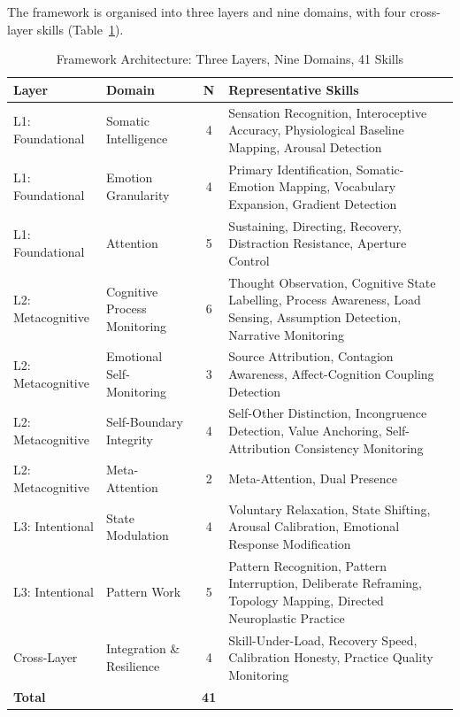 \documentclass[12pt, a4paper]{article}
\begin{document}
The framework is organised into three layers and nine domains, with four cross-layer
skills (Table~\ref{tab:architecture}).

\begin{table}[htbp]
\centering
\caption{Framework Architecture: Three Layers, Nine Domains, 41 Skills}
\label{tab:architecture}
\small
\begin{tabular}{llcp{6cm}}
\toprule
\textbf{Layer} & \textbf{Domain} & \textbf{N} & \textbf{Representative Skills} \\
\midrule
L1: Foundational & Somatic Intelligence & 4 &
  Sensation Recognition, Interoceptive Accuracy, Physiological Baseline Mapping, Arousal Detection \\
L1: Foundational & Emotion Granularity & 4 &
  Primary Identification, Somatic-Emotion Mapping, Vocabulary Expansion, Gradient Detection \\
L1: Foundational & Attention & 5 &
  Sustaining, Directing, Recovery, Distraction Resistance, Aperture Control \\
\midrule
L2: Metacognitive & Cognitive Process Monitoring & 6 &
  Thought Observation, Cognitive State Labelling, Process Awareness, Load Sensing, Assumption Detection, Narrative Monitoring \\
L2: Metacognitive & Emotional Self-Monitoring & 3 &
  Source Attribution, Contagion Awareness, Affect-Cognition Coupling Detection \\
L2: Metacognitive & Self-Boundary Integrity & 4 &
  Self-Other Distinction, Incongruence Detection, Value Anchoring, Self-Attribution Consistency Monitoring \\
L2: Metacognitive & Meta-Attention & 2 &
  Meta-Attention, Dual Presence \\
\midrule
L3: Intentional & State Modulation & 4 &
  Voluntary Relaxation, State Shifting, Arousal Calibration, Emotional Response Modification \\
L3: Intentional & Pattern Work & 5 &
  Pattern Recognition, Pattern Interruption, Deliberate Reframing, Topology Mapping, Directed Neuroplastic Practice \\
\midrule
Cross-Layer & Integration \& Resilience & 4 &
  Skill-Under-Load, Recovery Speed, Calibration Honesty, Practice Quality Monitoring \\
\midrule
\textbf{Total} & & \textbf{41} & \\
\bottomrule
\end{tabular}
\end{table}
\end{document}
